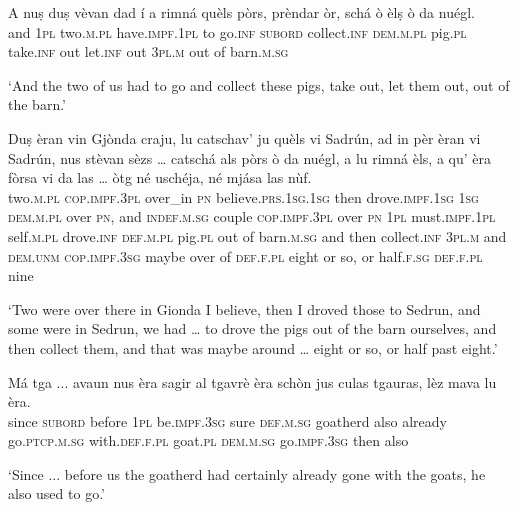 \begin{linenumbers}
	\gll    A nuṣ duṣ vèvan dad í a rimná quèls pòrs, prèndar òr, schá ò èlṣ ò da nuégl.\\
	and \textsc{1pl} two.\textsc{m.pl} have.\textsc{impf.1pl} to go.\textsc{inf}  \textsc{subord} collect.\textsc{inf} \textsc{dem.m.pl} pig.\textsc{pl} take.\textsc{inf} out  let.\textsc{inf} out \textsc{3pl.m} out of barn.\textsc{m.sg}\\
\end{linenumbers}
\medskip
\glt `And the two of us had to go and collect these pigs, take out, let them out, out of the barn.'
\medskip

\begin{linenumbers}
	\gll    Duṣ èran vin Gjònda craju, lu catschav' ju  quèls vi Sadrún, ad in pèr èran vi Sadrún, nus stèvan sèzs … catschá als pòrs ò da nuégl, a lu rimná èls, a qu’ èra fòrsa vi da las … òtg né uschéja, né mjása las nùf.\\
	two.\textsc{m.pl} \textsc{cop.impf.3pl} over\_in \textsc{pn} believe.\textsc{prs.1sg.1sg}  then drove.\textsc{impf.1sg} \textsc{1sg} \textsc{dem.m.pl} over  \textsc{pn}, and \textsc{indef.m.sg} couple \textsc{cop.impf.3pl} over \textsc{pn} \textsc{1pl} must.\textsc{impf.1pl} self.\textsc{m.pl} {} drove.\textsc{inf} \textsc{def.m.pl} pig.\textsc{pl} out of barn.\textsc{m.sg} and then collect.\textsc{inf} \textsc{3pl.m} and \textsc{dem.unm} \textsc{cop.impf.3sg} maybe over of \textsc{def.f.pl} {} eight or so, or half.\textsc{f.sg} \textsc{def.f.pl} nine\\
\end{linenumbers}
\medskip
\glt `Two were over there in Gionda I believe, then I droved those to Sedrun, and some were in Sedrun, we had … to drove the pigs out of the barn ourselves, and then collect them, and that was maybe around … eight or so, or half past eight.'
\medskip

\begin{linenumbers}
	\gll  Má tga ... avaun nus èra sagir al tgavrè èra schòn jus culas tgauras, lèz mava lu èra.\\
	since \textsc{subord} {} before \textsc{1pl} be.\textsc{impf.3sg} sure \textsc{def.m.sg} goatherd also already go.\textsc{ptcp.m.sg} with.\textsc{def.f.pl} goat.\textsc{pl} \textsc{dem.m.sg} go.\textsc{impf.3sg} then also\\
\end{linenumbers}
\medskip
\glt `Since ... before us the goatherd had certainly already gone with the goats, he also used to go.'
\medskip

